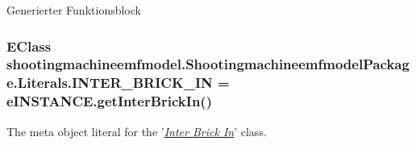Generierter Funktionsblock \hypertarget{interfaceshootingmachineemfmodel_1_1_shootingmachineemfmodel_package_1_1_literals_aad5124c60c5fe6faee5635ac2ef3005b}{
\subsubsection[{I\-N\-T\-E\-R\-\_\-\-B\-R\-I\-C\-K\-\_\-\-I\-N}]{\setlength{\rightskip}{0pt plus 5cm}E\-Class shootingmachineemfmodel.\-Shootingmachineemfmodel\-Package.\-Literals.\-I\-N\-T\-E\-R\-\_\-\-B\-R\-I\-C\-K\-\_\-\-I\-N = e\-I\-N\-S\-T\-A\-N\-C\-E.\-get\-Inter\-Brick\-In()}}\label{interfaceshootingmachineemfmodel_1_1_shootingmachineemfmodel_package_1_1_literals_aad5124c60c5fe6faee5635ac2ef3005b}
The meta object literal for the '\hyperlink{classshootingmachineemfmodel_1_1impl_1_1_inter_brick_in_impl}{{\itshape Inter Brick In}}' class.


